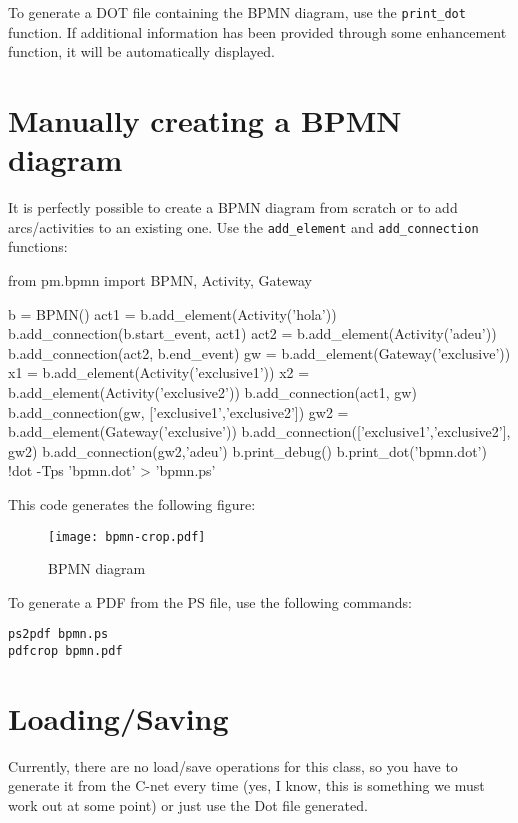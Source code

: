 \documentclass[a4paper,10pt]{book}
\begin{document}
To generate a DOT file containing the BPMN diagram, use the \texttt{print\_dot} function. If additional information has been provided through some enhancement function, it will be automatically displayed.

\section{Manually creating a BPMN diagram}

It is perfectly possible to create a BPMN diagram from scratch or to add arcs/activities to an existing one. Use the \texttt{add\_element} and \texttt{add\_connection} functions:\\

\begin{pycode}
from pm.bpmn import BPMN, Activity, Gateway

b = BPMN()
act1 = b.add_element(Activity('hola'))
b.add_connection(b.start_event, act1)
act2 = b.add_element(Activity('adeu'))
b.add_connection(act2, b.end_event)
gw = b.add_element(Gateway('exclusive'))
x1 = b.add_element(Activity('exclusive1'))
x2 = b.add_element(Activity('exclusive2'))
b.add_connection(act1, gw)
b.add_connection(gw, ['exclusive1','exclusive2'])
gw2 = b.add_element(Gateway('exclusive'))
b.add_connection(['exclusive1','exclusive2'], gw2)
b.add_connection(gw2,'adeu')
b.print_debug()
b.print_dot('bpmn.dot')
!dot -Tps 'bpmn.dot' > 'bpmn.ps'
\end{pycode}

This code generates the following figure:
\begin{figure}[htp]
 \centering
 \texttt{[image: bpmn-crop.pdf]}
 \caption{BPMN diagram}
 \label{fig:bpmn}
\end{figure}

To generate a PDF from the PS file, use the following commands:
\begin{Verbatim}
ps2pdf bpmn.ps
pdfcrop bpmn.pdf
\end{Verbatim}

\section{Loading/Saving}

Currently, there are no load/save operations for this class, so you have to generate it from the C-net every time (yes, I know, this is something we must work out at some point) or just use the Dot file generated.

\end{document}
